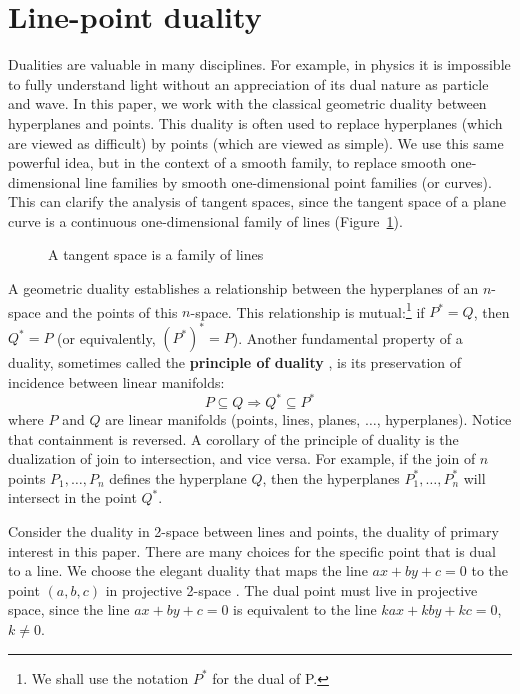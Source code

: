 \documentclass[12pt]{article}
\begin{document}
\section{Line-point duality}
\label{sec:duality}

Dualities are valuable in many disciplines.
For example, in physics it is impossible to fully understand light without
an appreciation of its dual nature as particle and wave.
In this paper, 
we work with the classical geometric duality between hyperplanes and points.
This duality is often used to replace hyperplanes (which are viewed as difficult)
by points (which are viewed as simple).
We use this same powerful idea, but in the context of a smooth family,
to replace smooth one-dimensional line families by smooth one-dimensional
point families (or curves).
This can clarify the analysis of tangent spaces,
since the tangent space of a plane curve is a continuous one-dimensional
family of lines (Figure~\ref{fig:linefamily}).

\begin{figure}[h]
\centerline{}
\caption{A tangent space is a family of lines}
\label{fig:linefamily}
\end{figure}

A geometric duality establishes a relationship between the hyperplanes 
of an $n$-space and the points of this $n$-space.
This relationship is mutual:\footnote{We shall use the notation $P^*$ for the dual of P.} 
if $P^* = Q$, then $Q^* = P$ (or equivalently, $(P^*)^* = P$).
Another fundamental property of a duality,
sometimes called the {\bf principle of duality} \cite{pedoe70}, %
is its preservation of incidence between linear manifolds:
\[
P \subseteq Q \Rightarrow Q^* \subseteq P^*
\]
where $P$ and $Q$ are linear manifolds (points, lines, planes, $\ldots$, hyperplanes).  %
Notice that containment is reversed.
A corollary of the principle of duality is the dualization of join to intersection, and vice versa.
For example, if the join of $n$ points $P_1, \ldots, P_n$ defines the hyperplane $Q$,
then the hyperplanes $P_1^*, \ldots, P_n^*$ will intersect in the point $Q^*$.

Consider the duality  in 2-space between lines and points,
the duality of primary interest in this paper.
There are many choices for the specific point that is dual to a line.
We choose the elegant duality that maps
the line $ax+by+c=0$ to the point $(a,b,c)$ in projective 2-space \cite{hartshorne77}.
The dual point must live in projective space,
since the line $ax + by + c = 0$ is equivalent to the line
$kax + kby + kc = 0$, $k \neq 0$.
\end{document}
